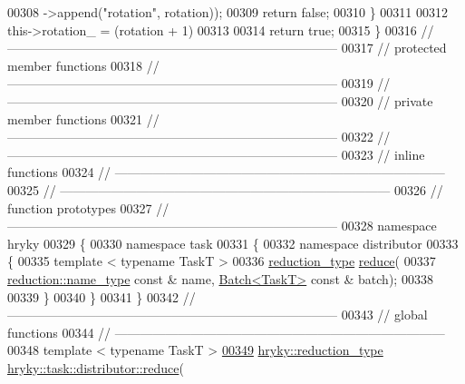 \begin{DoxyCode}
00308             ->append(\textcolor{stringliteral}{"rotation"}, rotation));
00309         \textcolor{keywordflow}{return} \textcolor{keyword}{false};
00310     \}
00311 
00312     this->rotation\_ = (rotation + 1) %
00313 
00314     \textcolor{keywordflow}{return} \textcolor{keyword}{true};
00315 \}
00316 \textcolor{comment}{//
      ------------------------------------------------------------------------------}
00317 \textcolor{comment}{// protected member functions}
00318 \textcolor{comment}{//
      ------------------------------------------------------------------------------}
00319 \textcolor{comment}{//
      ------------------------------------------------------------------------------}
00320 \textcolor{comment}{// private member functions}
00321 \textcolor{comment}{//
      ------------------------------------------------------------------------------}
00322 \textcolor{comment}{//
      ------------------------------------------------------------------------------}
00323 \textcolor{comment}{// inline functions}
00324 \textcolor{comment}{//
      ------------------------------------------------------------------------------}
00325 \textcolor{comment}{//
      ------------------------------------------------------------------------------}
00326 \textcolor{comment}{// function prototypes}
00327 \textcolor{comment}{//
      ------------------------------------------------------------------------------}
00328 \textcolor{keyword}{namespace }hryky
00329 \{
00330 \textcolor{keyword}{namespace }task
00331 \{
00332 \textcolor{keyword}{namespace }distributor
00333 \{
00335     \textcolor{keyword}{template} < \textcolor{keyword}{typename} TaskT >
00336     \hyperlink{classhryky_1_1_intrusive_ptr}{reduction_type} \hyperlink{group__task_ga89a7a92c43485c438438ab4b97184a27}{reduce}(
00337         \hyperlink{classhryky_1_1reduction_1_1_string}{reduction::name_type} \textcolor{keyword}{const} & name, \hyperlink{classhryky_1_1task_1_1distributor_1_1_batch}{Batch<TaskT>} \textcolor{keyword}{const} & batch);
00338 
00339 \}
00340 \}
00341 \}
00342 \textcolor{comment}{//
      ------------------------------------------------------------------------------}
00343 \textcolor{comment}{// global functions}
00344 \textcolor{comment}{//
      ------------------------------------------------------------------------------}
00348 \textcolor{comment}{}\textcolor{keyword}{template} < \textcolor{keyword}{typename} TaskT >
\hypertarget{task__distributor__batch_8h_source_l00349}{}\hyperlink{group__task_ga89a7a92c43485c438438ab4b97184a27}{00349} \hyperlink{classhryky_1_1_intrusive_ptr}{hryky::reduction_type} \hyperlink{group__task_ga89a7a92c43485c438438ab4b97184a27}{hryky::task::distributor::reduce}(

\end{DoxyCode}
